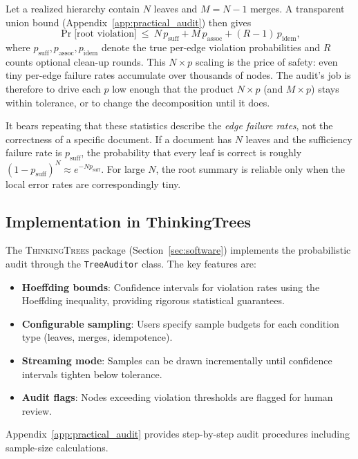 Let a realized hierarchy contain $N$ leaves and $M=N-1$ merges. A transparent union bound (Appendix~\ref{app:practical_audit}) then gives
\begin{equation}\label{eq:error_budget}
\Pr\big[\text{root violation}\big]\ \le\ N\,p_{\text{suff}} + M\,p_{\text{assoc}} + (R-1)\,p_{\text{idem}},
\end{equation}
where $p_{\text{suff}},p_{\text{assoc}},p_{\text{idem}}$ denote the true per-edge violation probabilities and $R$ counts optional clean-up rounds. This $N\times p$ scaling is the price of safety: even tiny per-edge failure rates accumulate over thousands of nodes. The audit's job is therefore to drive each $p$ low enough that the product $N\times p$ (and $M\times p$) stays within tolerance, or to change the decomposition until it does.

It bears repeating that these statistics describe the \emph{edge failure rates}, not the correctness of a specific document. If a document has $N$ leaves and the sufficiency failure rate is $p_{\text{suff}}$, the probability that every leaf is correct is roughly $(1-p_{\text{suff}})^N \approx e^{-Np_{\text{suff}}}$. For large $N$, the root summary is reliable only when the local error rates are correspondingly tiny.

\subsection{Implementation in ThinkingTrees}

The \textsc{ThinkingTrees} package (Section~\ref{sec:software}) implements the probabilistic audit through the \texttt{TreeAuditor} class. The key features are:

\begin{itemize}[nosep]
    \item \textbf{Hoeffding bounds}: Confidence intervals for violation rates using the Hoeffding inequality, providing rigorous statistical guarantees.
    \item \textbf{Configurable sampling}: Users specify sample budgets for each condition type (leaves, merges, idempotence).
    \item \textbf{Streaming mode}: Samples can be drawn incrementally until confidence intervals tighten below tolerance.
    \item \textbf{Audit flags}: Nodes exceeding violation thresholds are flagged for human review.
\end{itemize}

Appendix~\ref{app:practical_audit} provides step-by-step audit procedures including sample-size calculations.

